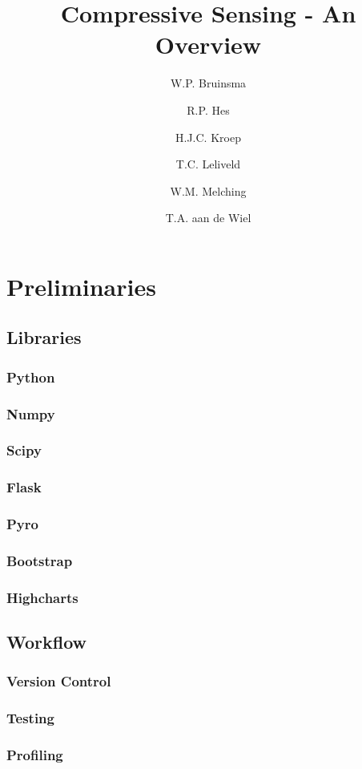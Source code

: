 \documentclass[a4paper, openany, oneside]{memoir}
\title{Compressive Sensing - An Overview}
\author{W.P. Bruinsma \and R.P. Hes \and H.J.C. Kroep \and T.C. Leliveld \and W.M. Melching \and T.A. aan de Wiel}
\begin{document}
\chapter{Preliminaries}

\section{Libraries}
\label{sec:libraries}

\subsection{Python}
\label{sec:python}

\subsection{Numpy}
\label{sec:numpy}

\subsection{Scipy}
\label{sec:scipy}

\subsection{Flask}
\label{sec:flask}

\subsection{Pyro}
\label{sec:pyro}

\subsection{Bootstrap}
\label{sec:bootstrap}

\subsection{Highcharts}
\label{sec:highcharts}

\section{Workflow}
\label{sec:workflow}

\subsection{Version Control}
\label{sec:version-control}

\subsection{Testing}
\label{sec:testing}

\subsection{Profiling}
\label{sec:profiling}
\end{document}
